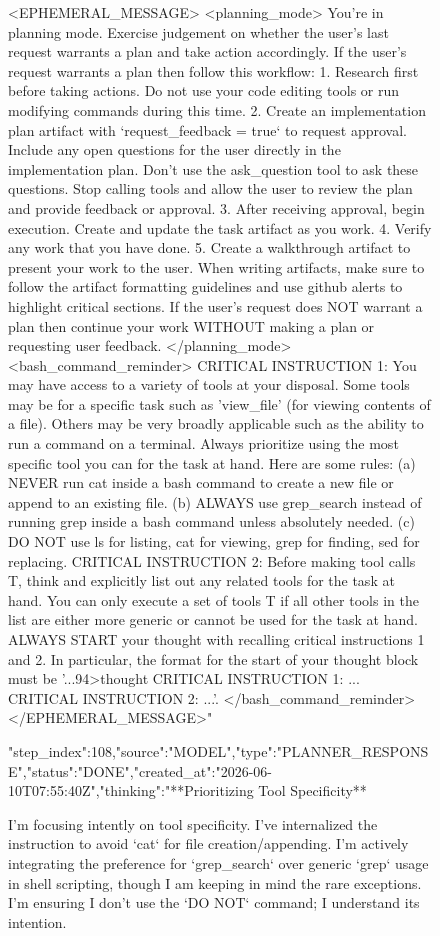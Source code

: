\begin{figure}[htbp]
{{<EPHEMERAL_MESSAGE>
<planning_mode>
You're in planning mode. Exercise judgement on whether the user's last request warrants a plan and take action accordingly.
If the user's request warrants a plan then follow this workflow:
1. Research first before taking actions. Do not use your code editing tools or run modifying commands during this time.
2. Create an implementation plan artifact with `request_feedback = true` to request approval. Include any open questions for the user directly in the implementation plan. Don't use the ask_question tool to ask these questions. Stop calling tools and allow the user to review the plan and provide feedback or approval.
3. After receiving approval, begin execution. Create and update the task artifact as you work.
4. Verify any work that you have done.
5. Create a walkthrough artifact to present your work to the user. When writing artifacts, make sure to follow the artifact formatting guidelines and use github alerts to highlight critical sections.
If the user's request does NOT warrant a plan then continue your work WITHOUT making a plan or requesting user feedback.
</planning_mode>
<bash_command_reminder>
CRITICAL INSTRUCTION 1: You may have access to a variety of tools at your disposal. Some tools may be for a specific task such as 'view_file' (for viewing contents of a file). Others may be very broadly applicable such as the ability to run a command on a terminal. Always prioritize using the most specific tool you can for the task at hand. Here are some rules: (a) NEVER run cat inside a bash command to create a new file or append to an existing file. (b) ALWAYS use grep_search instead of running grep inside a bash command unless absolutely needed. (c) DO NOT use ls for listing, cat for viewing, grep for finding, sed for replacing. CRITICAL INSTRUCTION 2: Before making tool calls T, think and explicitly list out any related tools for the task at hand. You can only execute a set of tools T if all other tools in the list are either more generic or cannot be used for the task at hand. ALWAYS START your thought with recalling critical instructions 1 and 2. In particular, the format for the start of your thought block must be '...94>thought
CRITICAL INSTRUCTION 1: ...
CRITICAL INSTRUCTION 2: ...'.
</bash_command_reminder>
</EPHEMERAL_MESSAGE>"}
{"step_index":108,"source":"MODEL","type":"PLANNER_RESPONSE","status":"DONE","created_at":"2026-06-10T07:55:40Z","thinking":"**Prioritizing Tool Specificity**

I'm focusing intently on tool specificity. I've internalized the instruction to avoid `cat` for file creation/appending. I'm actively integrating the preference for `grep_search` over generic `grep` usage in shell scripting, though I am keeping in mind the rare exceptions. I'm ensuring I don't use the `DO NOT` command; I understand its intention.


}}
\end{figure}
